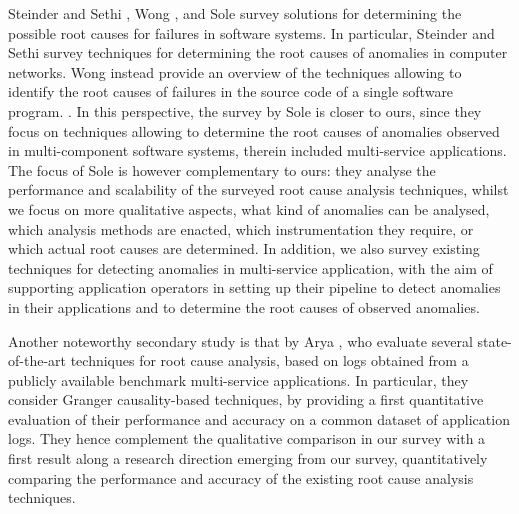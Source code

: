 Steinder and Sethi \cite{Steinder2004_FaultLocalizationTechniquesComputerNetworks}, Wong \etal \cite{Wong2016_SurveySoftwareFaultLocalization}, and Sole \etal \cite{Sole2017_SurveyRootCauseAnalysis} survey solutions for determining the possible root causes for failures in software systems.
In particular, Steinder and Sethi \cite{Steinder2004_FaultLocalizationTechniquesComputerNetworks} survey techniques for determining the root causes of anomalies in computer networks.
Wong \etal \cite{Wong2016_SurveySoftwareFaultLocalization} instead provide an overview of the techniques allowing to identify the root causes of failures in the source code of a single software program.  
.
%
In this perspective, the survey by Sole \etal \cite{Sole2017_SurveyRootCauseAnalysis} is closer to ours, since they focus on techniques allowing to determine the root causes of anomalies observed in multi-component software systems, therein included multi-service applications.
The focus of Sole \etal \cite{Sole2017_SurveyRootCauseAnalysis} is however complementary to ours: they analyse the performance and scalability of the surveyed root cause analysis techniques, whilst we focus on more qualitative aspects, \eg what kind of anomalies can be analysed, which analysis methods are enacted, which instrumentation they require, or which actual root causes are determined.
In addition, we also survey existing techniques for detecting anomalies in multi-service application, with the aim of supporting application operators in setting up their pipeline to detect anomalies in their applications and to determine the root causes of observed anomalies.

Another noteworthy secondary study is that by Arya \etal \cite{Arya2021_EvaluationCausalInferenceAIOps}, who evaluate several state-of-the-art techniques for root cause analysis, based on logs obtained from a publicly available benchmark multi-service applications. 
In particular, they consider Granger causality-based techniques, by providing a first quantitative evaluation of their performance and accuracy on a common dataset of application logs.
They hence complement the qualitative comparison in our survey with a first result along a research direction emerging from our survey, \viz quantitatively comparing the performance and accuracy of the existing root cause analysis techniques. 

